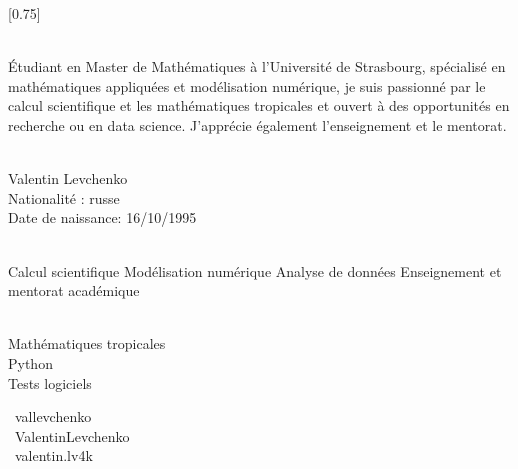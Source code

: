 \documentclass[lighthipster]{simplehipstercv}
\begin{document}
\setlength{\columnsep}{1.5cm}
[0.75]
\begin{paracol}{2}

\paracolbackgroundoptions



\footnotesize
{\setasidefontcolour
\flushright
\begin{center}
\end{center}

\\[0.5em]

{\footnotesize
Étudiant en Master de Mathématiques à l’Université de Strasbourg, spécialisé en mathématiques appliquées et modélisation numérique, 
je suis passionné par le calcul scientifique et les mathématiques tropicales et ouvert à des opportunités en recherche ou en 
data science. J'apprécie également l'enseignement et le mentorat.}
\bigskip

 \\[0.5em]
Valentin Levchenko\\
Nationalité : russe\\
Date de naissance: 16/10/1995


\bigskip

 \\[0.5em]

Calcul scientifique
Modélisation numérique
Analyse de données
Enseignement et mentorat académique

\bigskip

\\[0.5em]

Mathématiques tropicales\\
Python\\
Tests logiciels
\bigskip


\faLinkedin~vallevchenko \hspace{1.5em}\\
\faGithub~ValentinLevchenko \hspace{1.5em}\\
\faInstagram~valentin.lv4k

}
\end{paracol}
\end{document}
